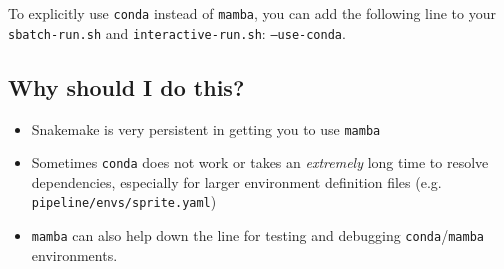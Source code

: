 \documentclass{article}
\begin{document}
    \noindent To explicitly use \texttt{conda} instead of \texttt{mamba}, you can add the following line to your \texttt{sbatch-run.sh} and \texttt{interactive-run.sh}: \texttt{--use-conda}.
    
    \subsection{Why should I do this?}
    \begin{itemize}
        \item Snakemake is very persistent in getting you to use \texttt{mamba}
        \item Sometimes \texttt{conda} does not work or takes an \textit{extremely} long time to resolve dependencies, especially for larger environment definition files (e.g. \texttt{pipeline/envs/sprite.yaml})
        \item \texttt{mamba} can also help down the line for testing and debugging \texttt{conda}/\texttt{mamba} environments.
    \end{itemize}
\end{document}
